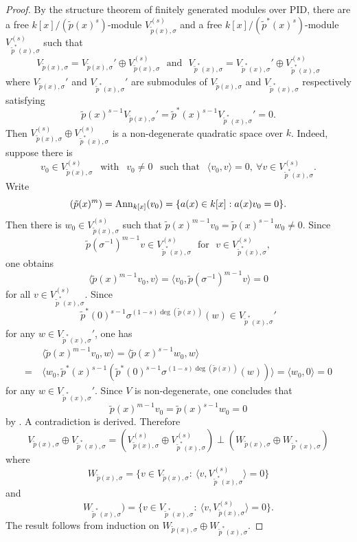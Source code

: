\documentclass[12pt]{amsart}
\begin{document}
\begin{proof}
By the structure theorem of finitely generated modules over PID, there are a free $k[x]/(\tilde{p}(x)^s)$-module $V_{\tilde{p}(x), \sigma}^ {(s)}$ and a free $k[x]/(\tilde{p}^*(x)^s)$-module $V_{\tilde{p}^*(x), \sigma}^ {(s)} $ such that 
$$ V_{\tilde{p}(x), \sigma} = V_{\tilde{p}(x), \sigma}' \oplus V_{\tilde{p}(x), \sigma}^ {(s)}  \ \ \ \text{and} \ \ \ 
 V_{\tilde{p}^*(x), \sigma} = V_{\tilde{p}^*(x), \sigma}'\oplus V_{\tilde{p}^*(x), \sigma}^ {(s)} $$ 
where  $V_{\tilde{p}(x), \sigma}'$ and $V_{\tilde{p}^*(x), \sigma}' $ are submodules of $ V_{\tilde{p}(x), \sigma} $ and $V_{\tilde{p}^*(x), \sigma}$ respectively satisfying $$\tilde{p}(x)^{s-1} V_{\tilde{p}(x), \sigma}'=\tilde{p}^*(x)^{s-1} V_{\tilde{p}^*(x), \sigma}' =0 . $$  Then $V_{\tilde{p}(x), \sigma}^ {(s)} \oplus V_{\tilde{p}^*(x), \sigma}^ {(s)} $ is a non-degenerate quadratic space over $k$. Indeed, suppose there is  $$v_0\in V_{\tilde{p}(x), \sigma}^ {(s)}  \ \ \text{ with }  \ \ v_0\neq 0 \ \ \text{ such that } \ \ \langle v_0, v \rangle =0, \  \forall  v\in V_{\tilde{p}^*(x), \sigma}^ {(s)} . $$ Write 
$$ (\tilde{p}(x)^m)={\rm Ann}_{k[x]} (v_0)= \{ a(x)\in k[x]: a(x) v_0=0 \}. $$
Then there is $w_0\in V_{\tilde{p}(x), \sigma}^ {(s)} $ such that $\tilde{p}(x)^{m-1}v_0= \tilde{p}(x)^{s-1}w_0\neq 0$.  Since $$\tilde{p}(\sigma^{-1})^{m-1} v\in  V_{\tilde{p}^*(x), \sigma}^ {(s)}  \  \ \ \text{for} \ \ \  v\in V_{\tilde{p}^*(x), \sigma}^ {(s)} ,$$ one obtains
$$\langle \tilde{p}(x)^{m-1}v_0, v \rangle = \langle v_0,  \tilde{p}(\sigma^{-1})^{m-1} v \rangle =0 $$ for all $v\in V_{\tilde{p}^*(x), \sigma}^ {(s)}$.  Since $$\tilde{p}^*(0)^{s-1} \sigma^{(1-s)\deg(\tilde{p}(x))}(w) \in V_{\tilde{p}^*(x), \sigma}' $$ for any $w\in V_{\tilde{p}^*(x), \sigma}' $, one has 
$$ \begin{aligned} & \langle \tilde{p}(x)^{m-1}v_0, w \rangle = \langle \tilde{p}(x)^{s-1}w_0, w \rangle \\
= \ & \langle w_0, \tilde{p}^*(x)^{s-1} (\tilde{p}^*(0)^{s-1} \sigma^{(1-s)\deg(\tilde{p}(x))}(w)) \rangle= \langle w_0, 0\rangle =0 \end{aligned} $$
for any $w\in V_{\tilde{p}^*(x), \sigma}' $. Since $V$ is non-degenerate, one concludes that  $$\tilde{p}(x)^{m-1}v_0= \tilde{p}(x)^{s-1}w_0= 0$$ by \cite[Lemma 3.1]{Mil}.  A contradiction is derived. Therefore 
$$ V_{\tilde{p}(x), \sigma} \oplus V_{\tilde{p}^*(x), \sigma}  = (V_{\tilde{p}(x), \sigma}^ {(s)}\oplus V_{\tilde{p}^*(x), \sigma}^ {(s)}) \perp (W_{\tilde{p}(x), \sigma} \oplus W_{\tilde{p}^*(x), \sigma} ) $$
where 
$$ W_{\tilde{p}(x), \sigma}=\{ v\in V_{\tilde{p}(x), \sigma}: \ \langle v, V_{\tilde{p}^*(x), \sigma}^ {(s)} \rangle =0 \}$$ and $$W_{\tilde{p}^*(x), \sigma} )= \{ v\in  V_{\tilde{p}^*(x), \sigma} : \ \langle v, V_{\tilde{p}(x), \sigma}^ {(s)} \rangle =0 \} . $$
The result follows from induction on $W_{\tilde{p}(x), \sigma} \oplus W_{\tilde{p}^*(x), \sigma}$.  \end{proof}
\end{document}
